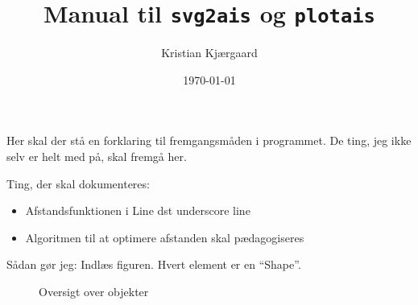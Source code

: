 \documentclass{mypaper}
\title{Manual til \texttt{svg2ais} og \texttt{plotais}}
\author{Kristian Kjærgaard}
\date{\today}
\begin{document}
\maketitle

Her skal der stå en forklaring til fremgangsmåden i programmet. De
ting, jeg ikke selv er helt med på, skal fremgå her.

Ting, der skal dokumenteres:

\begin{itemize}
\item Afstandsfunktionen i Line dst underscore line
\item Algoritmen til at optimere afstanden skal pædagogiseres
\end{itemize}

Sådan gør jeg: Indlæs figuren. Hvert element er en ``Shape''.

\begin{figure}[htbp]
  \centering
  
  \caption{Oversigt over objekter}
  \label{fig:obj-oversigt}
\end{figure}
\end{document}
